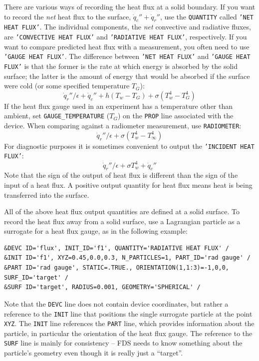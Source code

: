 \documentclass[11pt]{book}
\newcommand{\ct}{\tt\small}
\newcommand{\dq}{\dot{q}}
\begin{document}
There are various ways of recording the heat flux at a solid
boundary. If you want to record the {\em net} heat flux to the
surface, $\dq_c'' + \dq_r''$, use the {\ct QUANTITY} called {\ct 'NET HEAT FLUX'}. The individual components, the {\em net} convective and
radiative fluxes, are {\ct 'CONVECTIVE HEAT FLUX'} and {\ct 'RADIATIVE HEAT FLUX'}, respectively. If you want to compare predicted heat
flux with a measurement, you often need to use {\ct 'GAUGE HEAT FLUX'}.
The difference between {\ct 'NET HEAT FLUX'} and {\ct 'GAUGE HEAT FLUX'} is that
the former is the rate at which energy is absorbed by the solid surface;
the latter is the amount of energy that would be absorbed if the surface were cold (or some specified temperature $T_G$):
$$\dq_r''/\epsilon +\dq_c'' + h(T_w-T_G) + \sigma (T_w^4-T_G^4)$$
If the heat flux gauge used in an experiment has a temperature other
than ambient, set {\ct GAUGE\_TEMPERATURE} ($T_G$) on the {\ct PROP} line
associated with the device.  When comparing against a radiometer
measurement, use {\ct RADIOMETER}:
$$\dq_r''/\epsilon + \sigma (T_w^4-T_\infty^4) $$
For diagnostic purposes it is sometimes convenient to output the {\ct 'INCIDENT HEAT FLUX'}:
$$ \dq_r''/\epsilon + \sigma T_w^4 +\dq_c'' $$
Note that the sign of the output of heat flux is different than the sign of the input of a heat flux.  A positive
output quantity for heat flux means heat is being transferred into the surface.

All of the above heat flux output quantities are defined at a solid surface. To record the heat flux away from a solid surface, use a Lagrangian particle as a surrogate for
a heat flux gauge, as in the following example:

\footnotesize
\begin{verbatim}
&DEVC ID='flux', INIT_ID='f1', QUANTITY='RADIATIVE HEAT FLUX' /
&INIT ID='f1', XYZ=0.45,0.0,0.3, N_PARTICLES=1, PART_ID='rad gauge' /
&PART ID='rad gauge', STATIC=.TRUE., ORIENTATION(1,1:3)=-1,0,0, SURF_ID='target' /
&SURF ID='target', RADIUS=0.001, GEOMETRY='SPHERICAL' /
\end{verbatim}
\normalsize

\noindent
Note that the {\ct DEVC} line does not contain device coordinates, but rather a reference to the {\ct INIT} line that positions the single surrogate particle at the point {\ct XYZ}. The {\ct INIT} line references the {\ct PART} line, which provides information about the particle, in particular the orientation of the heat flux gauge. The reference to the {\ct SURF} line is mainly for consistency -- FDS needs to know something about the particle's geometry even though it is really just a ``target''.
\end{document}

